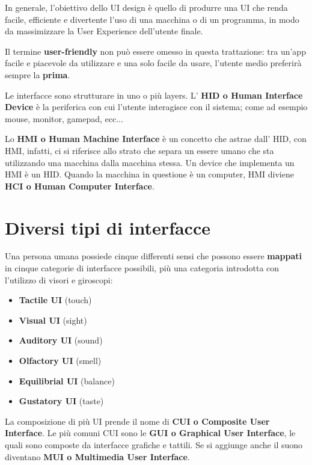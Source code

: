 \documentclass[a4paper,11pt,oneside]{book}
\begin{document}
In generale, l'obiettivo dello UI design è quello di produrre una UI che renda facile, efficiente e divertente l'uso di una macchina o di un programma, in modo da massimizzare la User Experience dell'utente finale.

Il termine \textbf{user-friendly} non può essere omesso in questa trattazione: tra un'app facile e piacevole da utilizzare e una solo facile da usare, l'utente medio preferirà sempre la \textbf{prima}.

Le interfacce sono strutturare in uno o più layers. L' \textbf{HID o Human Interface Device} è la periferica con cui l'utente interagisce con il sistema; come ad esempio mouse, monitor, gamepad, ecc...

Lo \textbf{HMI o Human Machine Interface} è un concetto che astrae dall' HID, con HMI, infatti, ci si riferisce allo strato che separa un essere umano che sta utilizzando una macchina dalla macchina stessa. Un device che implementa un HMI è un HID. Quando la macchina in questione è un computer, HMI diviene \textbf{HCI o Human Computer Interface}.

\section{Diversi tipi di interfacce}
Una persona umana possiede cinque differenti sensi che possono essere \textbf{mappati} in cinque categorie di interfacce possibili, più una categoria introdotta con l'utilizzo di visori e giroscopi:
\begin{itemize}
	\item \textbf{Tactile UI} (touch)
	\item \textbf{Visual UI} (sight)
	\item \textbf{Auditory UI} (sound)
	\item \textbf{Olfactory UI} (smell)
	\item \textbf{Equilibrial UI} (balance)
	\item \textbf{Gustatory UI} (taste)
\end{itemize}
La composizione di più UI prende il nome di \textbf{CUI o Composite User Interface}.
Le più comuni CUI sono le \textbf{GUI o Graphical User Interface}, le quali sono composte da interfacce grafiche e tattili. Se si aggiunge anche il suono diventano \textbf{MUI o Multimedia User Interface}.

\pagebreak
\end{document}

